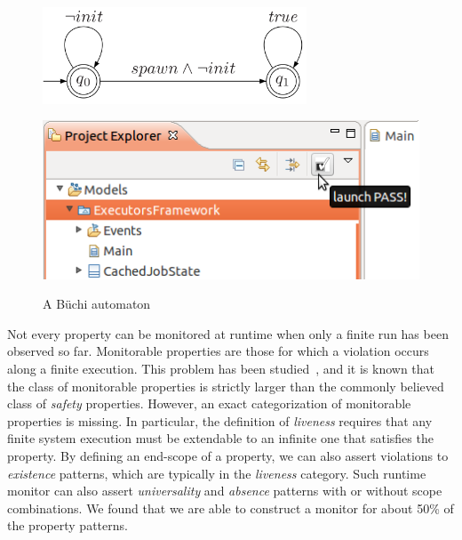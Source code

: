 \documentclass[letter]{llncs}
\begin{document}
\begin{figure}[!t]
 \centering
\begin{minipage}[!t]{0.5\linewidth}
\includegraphics[width=0.7\textwidth]{./Buchi.png}%
\caption{A B\"uchi automaton~\cite{Bauer:2011:RVL:2000799.2000800}}
\label{fig:Buchi}
\end{minipage}%
\begin{minipage}[t]{0.5\linewidth}
\includegraphics[width=1.0\textwidth]{./PASSlaunch.png}%
\label{fig:PASSlaunch}
%
\end{minipage}
\end{figure}

Not every property can be monitored at runtime when only a finite run has been 
observed so far. Monitorable properties are those for which a violation occurs along a finite execution.
This problem has been studied~\cite{DBLP:journals/corr/abs-1006-3638}, and it is known that the class of 
monitorable properties is strictly larger than the commonly believed class of \emph{safety} properties.
However, an exact categorization of monitorable properties is missing.
In particular, the definition of \emph{liveness} requires that any finite system
execution must be extendable to an infinite one that satisfies the property. 
By defining an end-scope of a property, we can also assert
violations to \emph{existence} patterns, which are typically in the \emph{liveness} category. 
Such runtime monitor can also assert \emph{universality} and \emph{absence} patterns 
with or without scope combinations. We found that we are able to construct 
a monitor for about 50\% of the property patterns.
\end{document}
